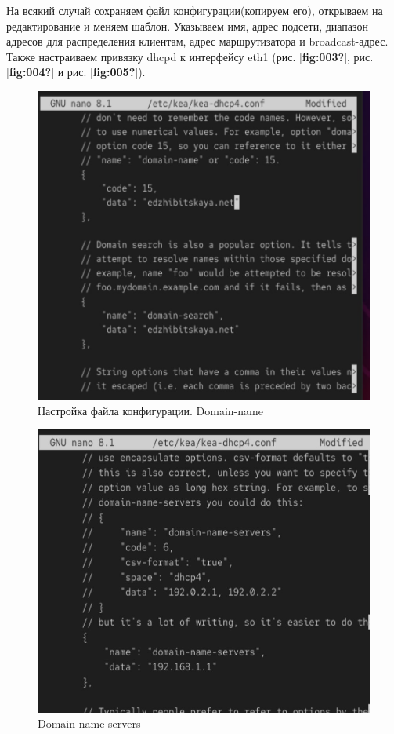 \documentclass[
  english,
  russian,
  12pt,
  a4paper,
  DIV=11,
  numbers=noendperiod]{scrreprt}
\begin{document}
На всякий случай сохраняем файл конфигурации(копируем его), открываем на
редактирование и меняем шаблон. Указываем имя, адрес подсети, диапазон
адресов для распределения клиентам, адрес маршрутизатора и
broadcast-адрес. Также настраиваем привязку dhcpd к интерфейсу eth1
(рис. {[}\textbf{fig:003?}{]}, рис. {[}\textbf{fig:004?}{]} и рис.
{[}\textbf{fig:005?}{]}).

\begin{figure}

{\centering \includegraphics[width=0.7\linewidth,height=\textheight,keepaspectratio]{image/3.jpg}

}

\caption{Настройка файла конфигурации. Domain-name}

\end{figure}%

\begin{figure}

{\centering \includegraphics[width=0.7\linewidth,height=\textheight,keepaspectratio]{image/4.jpg}

}

\caption{Domain-name-servers}

\end{figure}%
\end{document}
